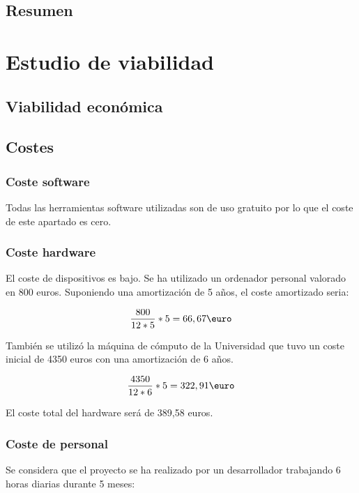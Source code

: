 \subsection{Resumen}

\section{Estudio de viabilidad}

\subsection{Viabilidad económica}

\subsection{Costes}
\subsubsection{Coste software}
Todas las herramientas software utilizadas son de uso gratuito por lo que el coste de este apartado es cero.
\subsubsection{Coste hardware}
El coste de dispositivos es bajo. Se ha utilizado un ordenador personal valorado en 800 euros. Suponiendo una amortización de 5 años, el coste amortizado seria:

\begin{equation}
\frac{800}{12 * 5} * 5 = 66,67  \text{\euro}
\end{equation}

También se utilizó la máquina de cómputo de la Universidad que tuvo un coste inicial de 4350 euros con una amortización de 6 años.

\begin{equation}
\frac{4350}{12 * 6} * 5 = 322,91  \text{\euro}
\end{equation}

El coste total del hardware será de 389,58 euros.

\subsubsection{Coste de personal}

Se considera que el proyecto se ha realizado por un desarrollador trabajando 6 horas diarias durante 5 meses:


